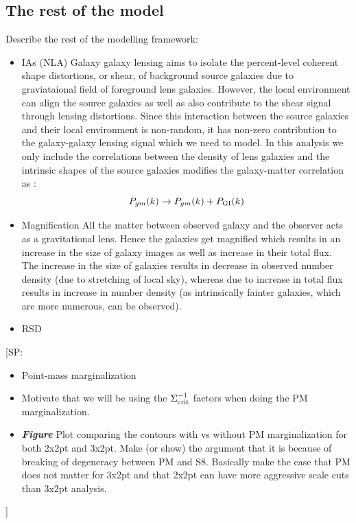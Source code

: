 \documentclass[fleqn,usenatbib]{mnras}
\newcommand{\SP}[1]{{\color{red}[SP: #1]}}
\begin{document}
\subsection{The rest of the model}
\label{sec:full_pk_th}
Describe the rest of the modelling framework:
\begin{itemize}
    \item IAs (NLA)
    Galaxy galaxy lensing aims to isolate the percent-level coherent shape distortions, or shear, of background source galaxies due to graviataional field of foreground lens galaxies. However, the local environment can align the source galaxies as well as also contribute to the shear signal through lensing distortions. Since this interaction between the source galaxies and their local environment is non-random, it has non-zero contribution to the galaxy-galaxy lensing signal which we need to model. In this analysis we only include the correlations between the density of lens galaxies and the intrinsic shapes of the source galaxies modifies the galaxy-matter correlation as :
    \begin{equation}
        P_{gm}(k) \rightarrow P_{gm}(k)  + P_{\rm GI}(k)
    \end{equation}
    \item Magnification
    All the matter between observed galaxy and the observer acts as a gravitational lens. Hence the galaxies get magnified which results in an increase in the size of galaxy images as well as increase in their total flux. The increase in the size of galaxies results in decrease in observed number density (due to stretching of local sky), whereas due to increase in total flux results in increase in number density (as intrinsically fainter galaxies, which are more numerous, can be observed).  
    \item RSD
\end{itemize}    

    
    \SP{
    \begin{itemize}
    \item Point-mass marginalization 
    \item  Motivate that we will be using the $\Sigma^{-1}_{\rm crit}$ factors when doing the PM marginalization. 
    \item \textbf{\textit{Figure}} Plot comparing the contours with vs without PM marginalization for both 2x2pt and 3x2pt. Make (or show) the argument that it is because of breaking of degeneracy between PM and S8. Basically make the case that PM does not matter for 3x2pt and that 2x2pt can have more aggressive scale cuts than 3x2pt analysis.
    \end{itemize}
    }
    
\end{document}
